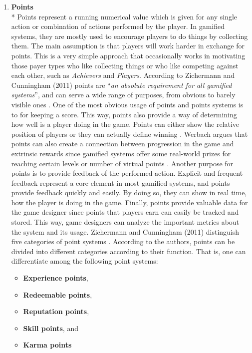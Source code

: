 \begin{enumerate}
\item \textbf{Points}\\*
Points represent a running numerical value which is given for any single action or combination of actions performed by the player. In gamified systems, they are mostly used to encourage players to do things by collecting them. The main assumption is that players will work harder in exchange for points. This is a very simple approach that occasionally works in motivating those payer types who like collecting things or who like competing against each other, such as \textit{Achievers} and \textit{Players}. According to Zichermann and Cunningham (2011) points are ``\textit{an absolute requirement for all gamified systems}'', and can serve a wide range of purposes, from obvious to barely visible ones \cite{zichermann2011gamification}. One of the most obvious usage of points and points systems is to for keeping a score. This way, points also provide a way of determining how well is a player doing in the game. Points can either show the relative position of players or they can actually define winning \cite{WerbachCoursera}. Werbach argues that points can also create a connection between progression in the game and extrinsic rewards since gamified systems offer some real-world prizes for reaching certain levels or number of virtual points \cite{werbach2012win}. Another purpose for points is to provide feedback of the performed action. Explicit and frequent feedback represent a core element in most gamified systems, and points provide feedback quickly and easily. By doing so, they can show in real time, how the player is doing in the game. Finally, points provide valuable data for the game designer since points that players earn can easily be tracked and stored. This way, game designers can analyze the important metrics about the system and its usage. Zichermann and Cunningham (2011) distinguish five categories of point systems \cite{zichermann2011gamification}. According to the authors, points  can  be  divided  into  different categories  according  to  their  function. That is, one can differentiate among the following point systems: 
\begin{itemize}
\item \textbf{Experience points},
\item \textbf{Redeemable points},
\item \textbf{Reputation points}, 
\item \textbf{Skill points}, and
\item \textbf{Karma  points}

\end{itemize}
\end{enumerate}

